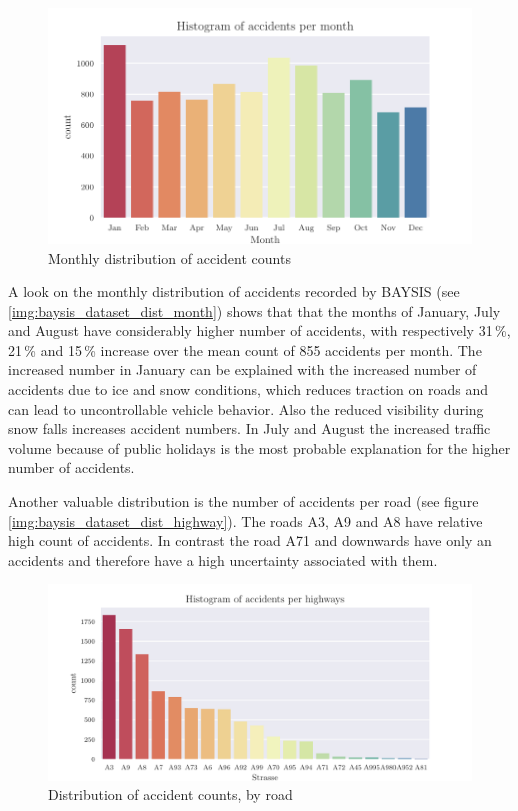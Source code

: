 \begin{figure}[ht]
	\centering
	\includegraphics[scale=0.9]{CorrAnalysis/data/BAYSIS/01_dataset/plots/baysis_dataset_hist_month}
	\caption{Monthly distribution of accident counts}
	\label{img:baysis_dataset_dist_month}
\end{figure}

A look on the monthly distribution of accidents recorded by BAYSIS (see \autoref{img:baysis_dataset_dist_month}) shows that that the months of January, July and August have considerably higher number of accidents, with respectively 31\,\%, 21\,\% and 15\,\% increase over the mean count of 855 accidents per month. The increased number in January can be explained with the increased number of accidents due to ice and snow conditions, which reduces traction on roads and can lead to uncontrollable vehicle behavior. Also the reduced visibility during snow falls increases accident numbers. In July and August the increased traffic volume because of public holidays is the most probable explanation for the higher number of accidents. 

Another valuable distribution is the number of accidents per road (see figure \autoref{img:baysis_dataset_dist_highway}). The roads A3, A9 and A8 have relative high count of accidents. In contrast the road A71 and downwards have only an accidents and therefore have a high uncertainty associated with them. 

\clearpage

\begin{figure}[ht]
	\centering
	\includegraphics[scale=0.75]{CorrAnalysis/data/BAYSIS/01_dataset/plots/baysis_dataset_hist_highway}
	\caption{Distribution of accident counts, by road}
	\label{img:baysis_dataset_dist_highway}
	\vspace{-8mm}
\end{figure}

